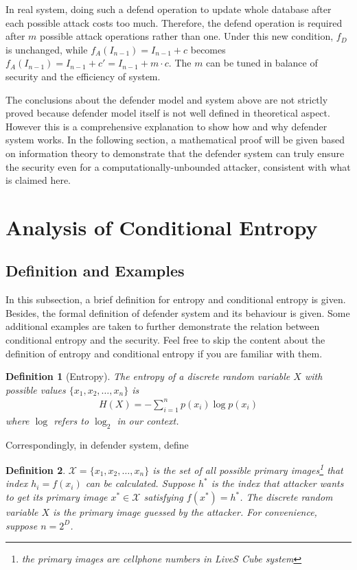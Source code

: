 \documentclass[10pt,a4paper]{article}
\newtheorem{mydef}{Definition}
\begin{document}
		In real system, doing such a defend operation to update whole
		database after each possible attack costs too much.
		Therefore, the defend operation is required after $m$
		possible attack operations rather than one. Under this
		new condition, $f_D$ is unchanged, while $f_A(I_{n-1}) = I_{n-1}+c$
		becomes $f_A(I_{n-1}) = I_{n-1}+c' = I_{n-1}+m \cdot c$.
		The $m$ can be tuned in balance of security and the
		efficiency of system.
		
		The conclusions about the defender model
		and system above are not strictly
		proved because defender model itself
		is not well defined in theoretical aspect. 
		However this is a comprehensive explanation to show how and why
		defender system works. In the following section, a mathematical proof
		will be given based on information theory to demonstrate that
		the defender system can truly ensure the security even for
		a computationally-unbounded attacker, consistent with what
		is claimed here.
		
\section{Analysis of Conditional Entropy}
	\subsection{Definition and Examples}
		In this subsection, a brief definition for entropy and conditional
		entropy is given. Besides, the formal definition of defender system
		and its behaviour is given.
		Some additional examples are taken to further
		demonstrate the relation between conditional entropy and
		the security. Feel free to skip the content about
		the definition of entropy and conditional entropy if you are familiar
		with them.		
		
		\begin{mydef}[Entropy]
			The entropy of a discrete random variable $X$ with
			possible values $\{x_1, x_2, \ldots, x_n\}$ is
			\begin{align}
				H(X) = -\sum_{i=1}^n p(x_i)\log p(x_i)
			\end{align}
			where $\log$ refers to $\log_2$ in our context.
		\end{mydef}
		
		Correspondingly, in defender system, define
		\begin{mydef}\label{def2}
			$\mathcal{X} = \{x_1, x_2, \ldots, x_n\}$ is the set of all possible 
			primary images\footnote{the primary images are cellphone numbers
			in LiveS Cube system} that index $h_i = f(x_i)$ can be calculated.
			Suppose $h^*$ is the index that attacker wants to
			get its primary image $x^* \in \mathcal{X}$ satisfying $f(x^*) = h^*$.
			The discrete random variable $X$ is the
			primary image guessed by the attacker. For convenience,
			suppose $n = 2^D$.
		\end{mydef}
		
\end{document}
